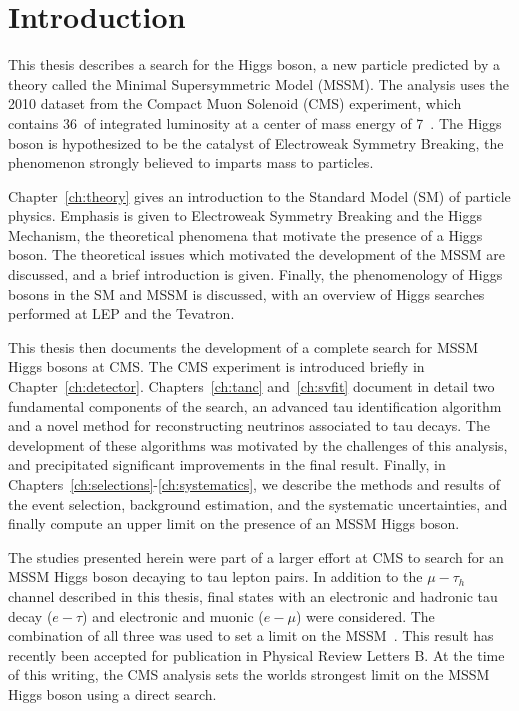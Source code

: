\ifx\master\undefined\fi
\chapter*{Introduction} 

This thesis describes a search for the Higgs boson, a new particle predicted by
a theory called the Minimal Supersymmetric Model (MSSM).  The analysis uses the
2010 dataset from the Compact Muon Solenoid (CMS) experiment, which contains
36~\pbinv of integrated luminosity at a center of mass energy of 7~\TeV.  The
Higgs boson is hypothesized to be the catalyst of Electroweak Symmetry Breaking,
the phenomenon strongly believed to imparts mass to particles.

Chapter~\ref{ch:theory} gives an introduction to the Standard Model (SM) of
particle physics. Emphasis is given to Electroweak Symmetry Breaking and the
Higgs Mechanism, the theoretical phenomena that motivate the presence of a Higgs
boson.  The theoretical issues which motivated the development of the MSSM are
discussed, and a brief introduction is given. Finally, the phenomenology of
Higgs bosons in the SM and MSSM is discussed, with an overview of Higgs searches
performed at LEP and the Tevatron.

This thesis then documents the development of a complete search for MSSM Higgs
bosons at CMS\@.  The CMS experiment is introduced briefly in
Chapter~\ref{ch:detector}. Chapters~\ref{ch:tanc} and~\ref{ch:svfit} document in
detail two fundamental components of the search, an advanced tau identification
algorithm and a novel method for reconstructing neutrinos associated to tau
decays.  The development of these algorithms was motivated by the challenges of
this analysis, and precipitated significant improvements in the final result.
Finally, in \mbox{Chapters~\ref{ch:selections}-\ref{ch:systematics}}, we
describe the methods and results of the event selection, background estimation,
and the systematic uncertainties, and finally compute an upper limit on the
presence of an MSSM Higgs boson.

The studies presented herein were part of a larger effort at CMS to search for
an MSSM Higgs boson decaying to tau lepton pairs.  In addition to the
$\mu-\tau_h$ channel described in this thesis, final states with an electronic
and hadronic tau decay ($e-\tau$) and electronic and muonic ($e-\mu$) were
considered.  The combination of all three was used to set a limit on the
MSSM~\cite{HIG-10-002}.  This result has recently been accepted for publication
in Physical Review Letters B.  At the time of this writing, the CMS analysis
sets the worlds strongest limit on the MSSM Higgs boson using a direct search.

\ifx\master\undefined\fi
